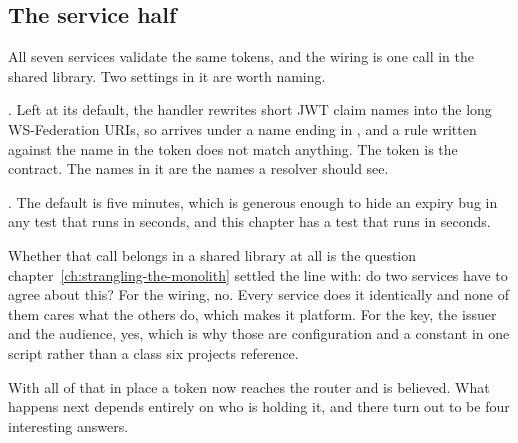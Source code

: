 \subsection*{The service half}

%
All seven services validate the same tokens, and the wiring is one call in the
shared library. Two settings in it are worth naming.

. Left at its default, the handler rewrites
short JWT claim names into the long WS-Federation URIs, so  arrives
under a  name ending in ,
and a rule written against the name in the token does not match anything. The
token is the contract. The names in it are the names a resolver should see.

. The default is five minutes, which is
generous enough to hide an expiry bug in any test that runs in seconds, and
this chapter has a test that runs in seconds.

Whether that call belongs in a shared library at all is the question
chapter~\ref{ch:strangling-the-monolith} settled the line with: do two services
have to agree about this? For the wiring, no. Every service does it identically and none of
them cares what the others do, which makes it platform. For the key, the issuer
and the audience, yes, which is why those are configuration and a constant in
one script rather than a class six projects reference.

\medskip

With all of that in place a token now reaches the router and is believed. What
happens next depends entirely on who is holding it, and there turn out to be
four interesting answers.

%
